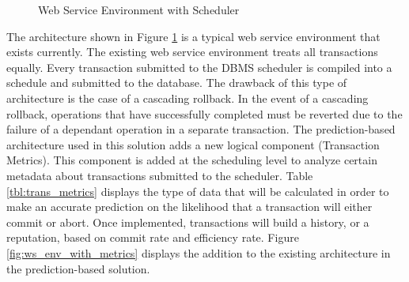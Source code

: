 \documentclass[conference]{IEEEtran}
\begin{document}
\begin{figure}[h]
\captionsetup{justification=centering}
\centering %


\caption{Web Service Environment with Scheduler} %
\label{fig:ws_env} %

\end{figure}

The architecture shown in Figure \ref{fig:ws_env} is a typical web service environment that exists currently. The existing web service environment treats all transactions equally. Every transaction submitted to the DBMS scheduler is compiled into a schedule and submitted to the database. The drawback of this type of architecture is the case of a cascading rollback. In the event of a cascading rollback, operations that have successfully completed must be reverted due to the failure of a dependant operation in a separate transaction. The prediction-based architecture used in this solution adds a new logical component (Transaction Metrics). This component is added at the scheduling level to analyze certain metadata about transactions submitted to the scheduler. Table \ref{tbl:trans_metrics} displays the type of data that will be calculated in order to make an accurate prediction on the likelihood that a transaction will either commit or abort. Once implemented, transactions will build a history, or a reputation, based on commit rate and efficiency rate. Figure \ref{fig:ws_env_with_metrics} displays the addition to the existing architecture in the prediction-based solution.
\end{document}

